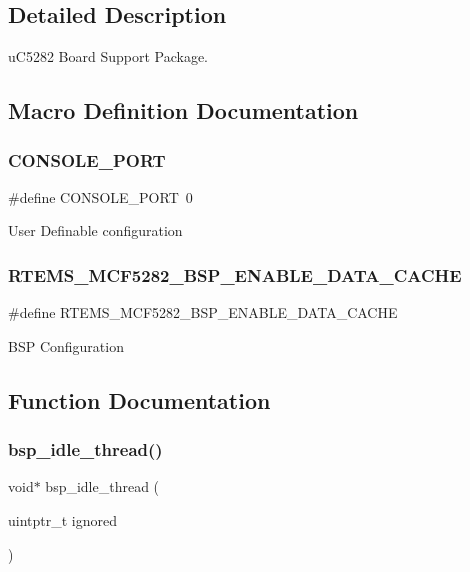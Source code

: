 \subsection{Detailed Description}
u\+C5282 Board Support Package. 



\subsection{Macro Definition Documentation}
\mbox{\label{group__RTEMSBSPsM68kUC5282_ga0859abd84f64f7f09ad95a4079b06f41}} 
\subsubsection{\texorpdfstring{CONSOLE\_PORT}{CONSOLE\_PORT}}
{\footnotesize\ttfamily \#define C\+O\+N\+S\+O\+L\+E\+\_\+\+P\+O\+RT~0}

User Definable configuration \mbox{\label{group__RTEMSBSPsM68kUC5282_ga8929b963b687e75af2467c8551c91cb0}} 
\subsubsection{\texorpdfstring{RTEMS\_MCF5282\_BSP\_ENABLE\_DATA\_CACHE}{RTEMS\_MCF5282\_BSP\_ENABLE\_DATA\_CACHE}}
{\footnotesize\ttfamily \#define R\+T\+E\+M\+S\+\_\+\+M\+C\+F5282\+\_\+\+B\+S\+P\+\_\+\+E\+N\+A\+B\+L\+E\+\_\+\+D\+A\+T\+A\+\_\+\+C\+A\+C\+HE}

B\+SP Configuration 

\subsection{Function Documentation}
\mbox{\label{group__RTEMSBSPsM68kUC5282_ga301be7085b80c41a9c5887247003c662}} 
\subsubsection{\texorpdfstring{bsp\_idle\_thread()}{bsp\_idle\_thread()}}
{\footnotesize\ttfamily void$\ast$ bsp\+\_\+idle\+\_\+thread (\begin{DoxyParamCaption}\item[{uintptr\+\_\+t}]{ignored }\end{DoxyParamCaption})}




